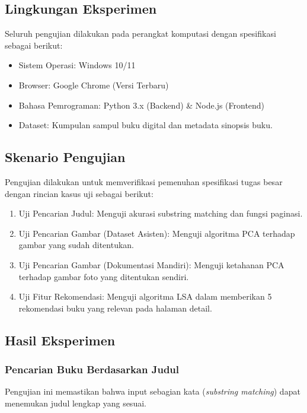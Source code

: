 \documentclass[12pt,a4paper]{article}
\begin{document}
\subsection{Lingkungan Eksperimen}
Seluruh pengujian dilakukan pada perangkat komputasi dengan spesifikasi sebagai berikut:
\begin{itemize}
    \item Sistem Operasi: Windows 10/11
    \item Browser: Google Chrome (Versi Terbaru)
    \item Bahasa Pemrograman: Python 3.x (Backend) \& Node.js (Frontend)
    \item Dataset: Kumpulan sampul buku digital dan metadata sinopsis buku.
\end{itemize}

\subsection{Skenario Pengujian}
Pengujian dilakukan untuk memverifikasi pemenuhan spesifikasi tugas besar dengan rincian kasus uji sebagai berikut:
\begin{enumerate}
    \item Uji Pencarian Judul: Menguji akurasi substring matching dan fungsi paginasi.
    \item Uji Pencarian Gambar (Dataset Asisten): Menguji algoritma PCA terhadap gambar yang sudah ditentukan.
    \item Uji Pencarian Gambar (Dokumentasi Mandiri): Menguji ketahanan PCA terhadap gambar foto yang ditentukan sendiri.
    \item Uji Fitur Rekomendasi: Menguji algoritma LSA dalam memberikan 5 rekomendasi buku yang relevan pada halaman detail.
\end{enumerate}

\subsection{Hasil Eksperimen}
\subsubsection{Pencarian Buku Berdasarkan Judul}
Pengujian ini memastikan bahwa input sebagian kata (\textit{substring matching}) dapat menemukan judul lengkap yang sesuai.
\end{document}
